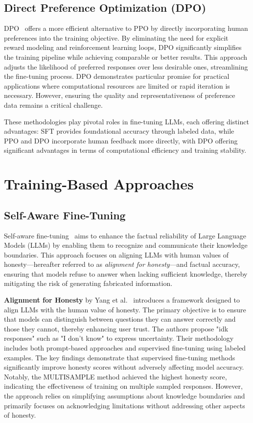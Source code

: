 \documentclass{article}
\begin{document}
\subsection{Direct Preference Optimization (DPO)}
DPO~\cite{rafailov_direct_2024} offers a more efficient alternative to PPO by directly incorporating human preferences into the training objective. By eliminating the need for explicit reward modeling and reinforcement learning loops, DPO significantly simplifies the training pipeline while achieving comparable or better results. This approach adjusts the likelihood of preferred responses over less desirable ones, streamlining the fine-tuning process. DPO demonstrates particular promise for practical applications where computational resources are limited or rapid iteration is necessary. However, ensuring the quality and representativeness of preference data remains a critical challenge.

These methodologies play pivotal roles in fine-tuning LLMs, each offering distinct advantages: SFT provides foundational accuracy through labeled data, while PPO and DPO incorporate human feedback more directly, with DPO offering significant advantages in terms of computational efficiency and training stability.

\section{Training-Based Approaches}
\label{sec:training_based}

\subsection{Self-Aware Fine-Tuning}
\label{sec:self_aware}
Self-aware fine-tuning~\cite{SurveyHonestyLargeLanguageModels2024} aims to enhance the factual reliability of Large Language Models (LLMs) by enabling them to recognize and communicate their knowledge boundaries. This approach focuses on aligning LLMs with human values of honesty—hereafter referred to as \textit{alignment for honesty}—and factual accuracy, ensuring that models refuse to answer when lacking sufficient knowledge, thereby mitigating the risk of generating fabricated information.

\textbf{Alignment for Honesty} by Yang et al.~\cite{AlignmentHonesty2024} introduces a framework designed to align LLMs with the human value of honesty. The primary objective is to ensure that models can distinguish between questions they can answer correctly and those they cannot, thereby enhancing user trust. The authors propose "idk responses" such as "I don't know" to express uncertainty. Their methodology includes both prompt-based approaches and supervised fine-tuning using labeled examples. The key findings demonstrate that supervised fine-tuning methods significantly improve honesty scores without adversely affecting model accuracy. Notably, the MULTISAMPLE method achieved the highest honesty score, indicating the effectiveness of training on multiple sampled responses. However, the approach relies on simplifying assumptions about knowledge boundaries and primarily focuses on acknowledging limitations without addressing other aspects of honesty.
\end{document}
